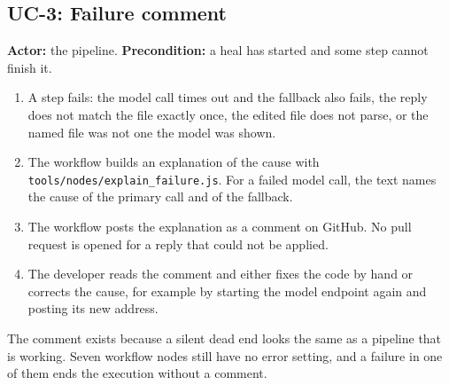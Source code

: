 \subsection{UC-3: Failure comment}

\textbf{Actor:} the pipeline. \textbf{Precondition:} a heal has started and some step cannot finish it.

\begin{enumerate}
  \item A step fails: the model call times out and the fallback also fails, the reply does not match the file exactly once, the edited file does not parse, or the named file was not one the model was shown.
  \item The workflow builds an explanation of the cause with \texttt{tools/\allowbreak{}nodes/\allowbreak{}explain\_\allowbreak{}failure.js}. For a failed model call, the text names the cause of the primary call and of the fallback.
  \item The workflow posts the explanation as a comment on GitHub. No pull request is opened for a reply that could not be applied.
  \item The developer reads the comment and either fixes the code by hand or corrects the cause, for example by starting the model endpoint again and posting its new address.
\end{enumerate}

The comment exists because a silent dead end looks the same as a pipeline that is working. Seven workflow nodes still have no error setting, and a failure in one of them ends the execution without a comment.
